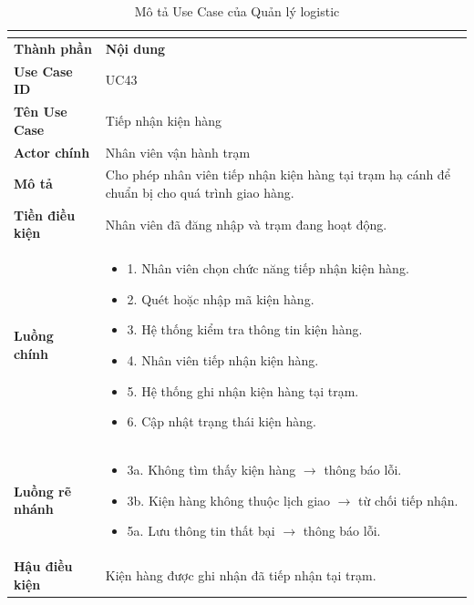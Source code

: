 \begin{longtable}{|C{3cm}|L{11cm}|}
\caption{Mô tả Use Case của Quản lý logistic}\\
\label{tab:mo-ta-uc-quan-ly-logistic-01}\\
\hline
\textbf{Thành phần} & \textbf{Nội dung} \\
\hline
\textbf{Use Case ID} & UC43 \\
\hline
\textbf{Tên Use Case} & Tiếp nhận kiện hàng \\
\hline
\textbf{Actor chính} & Nhân viên vận hành trạm \\
\hline
\textbf{Mô tả} & Cho phép nhân viên tiếp nhận kiện hàng tại trạm hạ cánh để chuẩn bị cho quá trình giao hàng. \\
\hline
\textbf{Tiền điều kiện} & Nhân viên đã đăng nhập và trạm đang hoạt động. \\
\hline
\textbf{Luồng chính} &
\begin{itemize}[leftmargin=*,topsep=2pt,itemsep=2pt]
    \item 1. Nhân viên chọn chức năng tiếp nhận kiện hàng.
    \item 2. Quét hoặc nhập mã kiện hàng.
    \item 3. Hệ thống kiểm tra thông tin kiện hàng.
    \item 4. Nhân viên tiếp nhận kiện hàng.
    \item 5. Hệ thống ghi nhận kiện hàng tại trạm.
    \item 6. Cập nhật trạng thái kiện hàng.
\end{itemize} \\
\hline
\textbf{Luồng rẽ nhánh} &
\begin{itemize}[leftmargin=*,topsep=2pt,itemsep=2pt]
    \item 3a. Không tìm thấy kiện hàng $\rightarrow$ thông báo lỗi.
    \item 3b. Kiện hàng không thuộc lịch giao $\rightarrow$ từ chối tiếp nhận.
    \item 5a. Lưu thông tin thất bại $\rightarrow$ thông báo lỗi.
\end{itemize} \\
\hline
\textbf{Hậu điều kiện} & Kiện hàng được ghi nhận đã tiếp nhận tại trạm. \\
\hline
\end{longtable}

